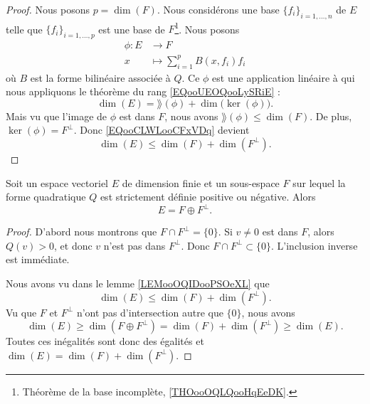 \begin{proof}
    Nous posons \( p=\dim(F)\). Nous considérons une base \( \{ f_i \}_{i=1,\ldots, n}\) de \( E\) telle que \( \{ f_i \}_{i=1,\ldots, p}\) est une base de \( F\)\footnote{Théorème de la base incomplète, \ref{THOooOQLQooHqEeDK}.}. Nous posons
    \begin{equation}
        \begin{aligned}
            \phi\colon E&\to F \\
            x&\mapsto \sum_{i=1}^pB(x,f_i)f_i 
        \end{aligned}
    \end{equation}
    où \( B\) est la forme bilinéaire associée à \( Q\). Ce \( \phi\) est une application linéaire à qui nous appliquons le théorème du rang \eqref{EQooUEOQooLySRiE} :
    \begin{equation}        \label{EQooCLWLooCFxVDq}
        \dim(E)=\rang(\phi)+\dim\big( \ker(\phi) \big).
    \end{equation}
    Mais vu que l'image de \( \phi\) est dans \( F\), nous avons \( \rang(\phi)\leq \dim(F)\). De plus, \( \ker(\phi)=F^{\perp}\). Donc \eqref{EQooCLWLooCFxVDq} devient
    \begin{equation}
        \dim(E)\leq \dim(F)+\dim(F^{\perp}).
    \end{equation}
\end{proof}

\begin{lemma}     \label{LEMooUOZOooYvEcji}
    Soit un espace vectoriel \( E\) de dimension finie et un sous-espace \( F\) sur lequel la forme quadratique \( Q\) est strictement définie positive ou négative. Alors
    \begin{equation}
        E=F\oplus F^{\perp}.
    \end{equation}
\end{lemma}

\begin{proof}
    D'abord nous montrons que \( F\cap F^{\perp}=\{ 0 \}\). Si \( v\neq 0\) est dans \( F\), alors \( Q(v)>0\), et donc \( v\) n'est pas dans \( F^{\perp}\). Donc \( F\cap F^{\perp}\subset \{ 0 \}\). L'inclusion inverse est immédiate.

    Nous avons vu dans le lemme \ref{LEMooOQIDooPSOeXL} que
    \begin{equation}
        \dim(E)\leq \dim(F)+\dim(F^{\perp}).
    \end{equation}
    Vu que \( F\) et \( F^{\perp}\) n'ont pas d'intersection autre que \( \{ 0 \}\), nous avons
    \begin{equation}
        \dim(E)\geq\dim(F\oplus F^{\perp}) = \dim(F)+\dim(F^{\perp}) \geq\dim(E).
    \end{equation}
    Toutes ces inégalités sont donc des égalités et \( \dim(E)=\dim(F)+\dim(F^{\perp})\).
\end{proof}



